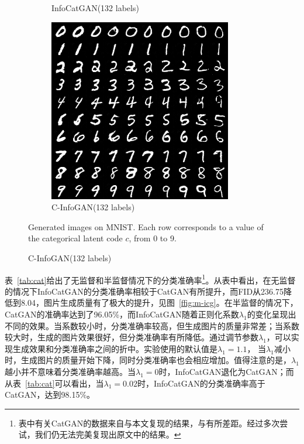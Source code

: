 \begin{figure}[htbp]
\begin{subfigure}[b]{\trif\textwidth}
    \caption{InfoCatGAN(132 labels)}
    \label{ffig:m-ss-icg}
  \end{subfigure}
  \begin{subfigure}[b]{\trif\textwidth}
    \includegraphics[width=\textwidth]{Img/ig-132labels.png}
    \caption{C-InfoGAN(132 labels)}
    \label{ffig:m-ss-ig}
  \end{subfigure}

  {Generated images on MNIST. Each row corresponds to a value of the categorical latent code $c$, from 0 to 9.}
  \label{fig:mnist}
\end{figure}

表~\ref{tab:cat}给出了无监督和半监督情况下的分类准确率\footnote{表中有关CatGAN的数据来自与本文复现的结果，与\citet{springenberg2015unsupervised}有所差距。经过多次尝试，我们仍无法完美复现出原文中的结果。}。从表中看出，在无监督的情况下InfoCatGAN的分类准确率相较于CatGAN有所提升，而FID从236.75降低到8.04，图片生成质量有了极大的提升，见图~\ref{ffig:m-icg}。在半监督的情况下，CatGAN的准确率达到了96.05\%，而InfoCatGAN随着正则化系数$\lambda_1$的变化呈现出不同的效果。当系数较小时，分类准确率较高，但生成图片的质量非常差；当系数较大时，生成的图片效果很好，但分类准确率有所降低。通过调节参数$\lambda_1$，可以实现生成效果和分类准确率之间的折中。实验使用的默认值是$\lambda_1 = 1.1$，
当$\lambda_1$减小时，生成图片的质量开始下降，同时分类准确率也会相应增加。值得注意的是，$\lambda_1$越小并不意味着分类准确率越高。当$\lambda_1=0$时，InfoCatGAN退化为CatGAN；而从表~\ref{tab:cat}可以看出，当$\lambda_1=0.02$时，InfoCatGAN的分类准确率高于CatGAN，达到98.15\%。

